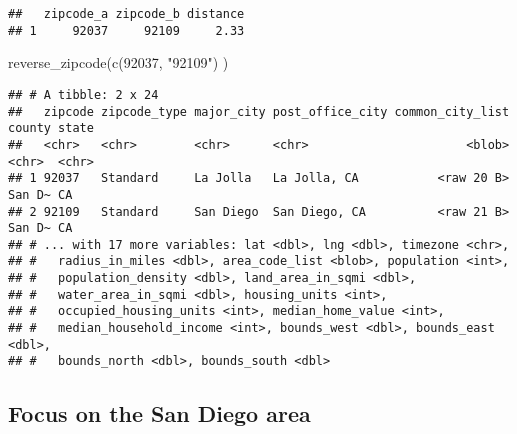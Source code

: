 \documentclass[
]{article}
\newenvironment{Shaded}{\begin{snugshade}}{\end{snugshade}}
\newcommand{\CommentTok}[1]{\textcolor[rgb]{0.56,0.35,0.01}{\textit{#1}}}
\newcommand{\FunctionTok}[1]{\textcolor[rgb]{0.00,0.00,0.00}{#1}}
\newcommand{\NormalTok}[1]{#1}
\newcommand{\OtherTok}[1]{\textcolor[rgb]{0.56,0.35,0.01}{#1}}
\newcommand{\SpecialCharTok}[1]{\textcolor[rgb]{0.00,0.00,0.00}{#1}}
\newcommand{\StringTok}[1]{\textcolor[rgb]{0.31,0.60,0.02}{#1}}
\begin{document}
\begin{verbatim}
##   zipcode_a zipcode_b distance
## 1     92037     92109     2.33
\end{verbatim}

\begin{Shaded}
\begin{Highlighting}[]
\FunctionTok{reverse\_zipcode}\NormalTok{(}\FunctionTok{c}\NormalTok{(}\StringTok{\textquotesingle{}92037\textquotesingle{}}\NormalTok{, }\StringTok{"92109"}\NormalTok{) )}
\end{Highlighting}
\end{Shaded}

\begin{verbatim}
## # A tibble: 2 x 24
##   zipcode zipcode_type major_city post_office_city common_city_list county state
##   <chr>   <chr>        <chr>      <chr>                      <blob> <chr>  <chr>
## 1 92037   Standard     La Jolla   La Jolla, CA           <raw 20 B> San D~ CA   
## 2 92109   Standard     San Diego  San Diego, CA          <raw 21 B> San D~ CA   
## # ... with 17 more variables: lat <dbl>, lng <dbl>, timezone <chr>,
## #   radius_in_miles <dbl>, area_code_list <blob>, population <int>,
## #   population_density <dbl>, land_area_in_sqmi <dbl>,
## #   water_area_in_sqmi <dbl>, housing_units <int>,
## #   occupied_housing_units <int>, median_home_value <int>,
## #   median_household_income <int>, bounds_west <dbl>, bounds_east <dbl>,
## #   bounds_north <dbl>, bounds_south <dbl>
\end{verbatim}

\begin{Shaded}
\end{Shaded}

\hypertarget{focus-on-the-san-diego-area}{%
\subsection{Focus on the San Diego
area}\label{focus-on-the-san-diego-area}}

\begin{Shaded}
\end{Shaded}
\end{document}
